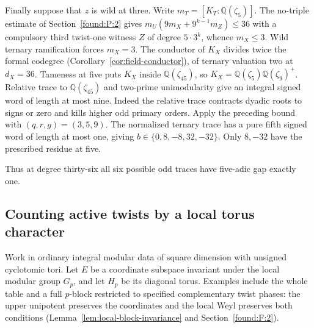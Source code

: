 \documentclass[11pt,a4paper]{article}
\numberwithin{equation}{section}
\theoremstyle{remark}
\begin{document}
Finally suppose that $z$ is wild at three. Write $m_T=[K_T:\mathbb Q(\zeta_5)]$. The no-triple estimate of Section~\ref{found:P:2} gives $m_U(9m_X+9^{k-1}m_Z)\le36$ with a compulsory third twist-one witness $Z$ of degree $5\cdot3^k$, whence $m_X\le3$. Wild ternary ramification forces $m_X=3$. The conductor of $K_X$ divides twice the formal codegree (Corollary~\ref{cor:field-conductor}), of ternary valuation two at $d_X=36$. Tameness at five puts $K_X$ inside $\mathbb Q(\zeta_{45})$, so $K_X=\mathbb Q(\zeta_5)\mathbb Q(\zeta_9)^+$. Relative trace to $\mathbb Q(\zeta_{45})$ and two-prime unimodularity give an integral signed word of length at most nine. Indeed the relative trace contracts dyadic roots to signs or zero and kills higher odd primary orders. Apply the preceding bound with $(q,r,g)=(3,5,9)$. The normalized ternary trace has a pure fifth signed word of length at most one, giving $b\in\{0,8,-8,32,-32\}$. Only $8,-32$ have the prescribed residue at five.

Thus at degree thirty-six all six possible odd traces have five-adic gap exactly one.

\subsection{Counting active twists by a local torus character}\label{found:T:1}
\label{found:T:key:sec:geometry}
Work in ordinary integral modular data of square dimension with unsigned cyclotomic tori. Let $E$ be a coordinate subspace invariant under the local modular group $G_p$, and let $H_p$ be its diagonal torus. Examples include the whole table and a full $p$-block restricted to specified complementary twist phases: the upper unipotent preserves the coordinates and the local Weyl preserves both conditions (Lemma~\ref{lem:local-block-invariance} and Section~\ref{found:F:2}).
\end{document}
